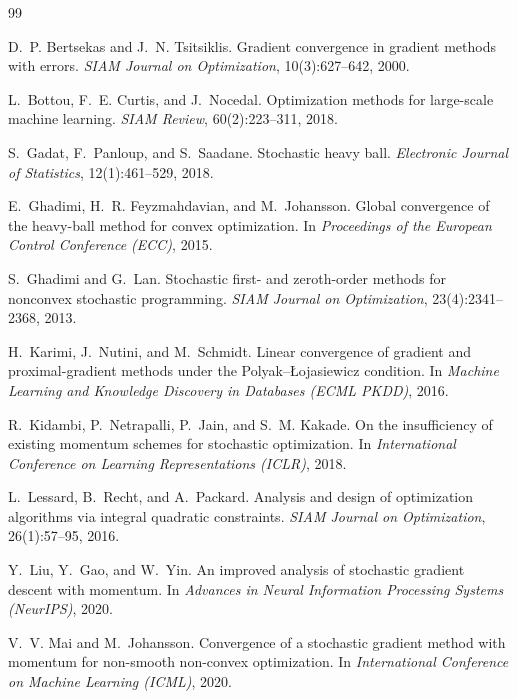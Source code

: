 \begin{thebibliography}{99}
\small

D.~P. Bertsekas and J.~N. Tsitsiklis.
\newblock Gradient convergence in gradient methods with errors.
\newblock \emph{SIAM Journal on Optimization}, 10(3):627--642, 2000.

L.~Bottou, F.~E. Curtis, and J.~Nocedal.
\newblock Optimization methods for large-scale machine learning.
\newblock \emph{SIAM Review}, 60(2):223--311, 2018.

S.~Gadat, F.~Panloup, and S.~Saadane.
\newblock Stochastic heavy ball.
\newblock \emph{Electronic Journal of Statistics}, 12(1):461--529, 2018.

E.~Ghadimi, H.~R. Feyzmahdavian, and M.~Johansson.
\newblock Global convergence of the heavy-ball method for convex optimization.
\newblock In \emph{Proceedings of the European Control Conference (ECC)}, 2015.

S.~Ghadimi and G.~Lan.
\newblock Stochastic first- and zeroth-order methods for nonconvex stochastic programming.
\newblock \emph{SIAM Journal on Optimization}, 23(4):2341--2368, 2013.

H.~Karimi, J.~Nutini, and M.~Schmidt.
\newblock Linear convergence of gradient and proximal-gradient methods under the
  {P}olyak--{\L}ojasiewicz condition.
\newblock In \emph{Machine Learning and Knowledge Discovery in Databases (ECML PKDD)}, 2016.

R.~Kidambi, P.~Netrapalli, P.~Jain, and S.~M. Kakade.
\newblock On the insufficiency of existing momentum schemes for stochastic optimization.
\newblock In \emph{International Conference on Learning Representations (ICLR)}, 2018.

L.~Lessard, B.~Recht, and A.~Packard.
\newblock Analysis and design of optimization algorithms via integral quadratic constraints.
\newblock \emph{SIAM Journal on Optimization}, 26(1):57--95, 2016.

Y.~Liu, Y.~Gao, and W.~Yin.
\newblock An improved analysis of stochastic gradient descent with momentum.
\newblock In \emph{Advances in Neural Information Processing Systems (NeurIPS)}, 2020.

V.~V. Mai and M.~Johansson.
\newblock Convergence of a stochastic gradient method with momentum for non-smooth
  non-convex optimization.
\newblock In \emph{International Conference on Machine Learning (ICML)}, 2020.


\end{thebibliography}
